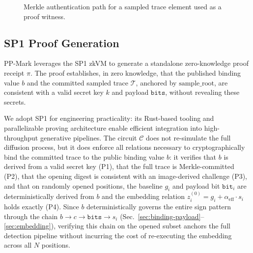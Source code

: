 \documentclass{article}
\theoremstyle{plain}
\theoremstyle{definition}
\theoremstyle{remark}
\begin{document}
\begin{figure}[t]
  \centering
  \caption{Merkle authentication path for a sampled trace element used as a proof witness.}
  \label{fig:merkle}
\end{figure}

\subsection{SP1 Proof Generation}
PP-Mark leverages the SP1 zkVM \cite{succinct2024sp1} to generate a standalone zero-knowledge proof receipt \(\pi\). The proof establishes, in zero knowledge, that the published binding value \(b\) and the committed sampled trace \(\mathcal{T}\), anchored by \(\mathrm{sample\_root}\), are consistent with a valid secret key \(k\) and payload \(\mathtt{bits}\), without revealing these secrets.

We adopt SP1 for engineering practicality: its Rust-based tooling and parallelizable proving architecture enable efficient integration into high-throughput generative pipelines. The circuit \(\mathcal{C}\) does not re-simulate the full diffusion process, but it does enforce all relations necessary to cryptographically bind the committed trace to the public binding value $b$: it verifies that $b$ is derived from a valid secret key (P1), that the full trace is Merkle-committed (P2), that the opening digest is consistent with an image-derived challenge (P3), and that on randomly opened positions, the baseline $g_i$ and payload bit $\mathtt{bit}_i$ are deterministically derived from $b$ and the embedding relation $z_i^{(0)} = g_i + \alpha_{\mathrm{eff}} \cdot s_i$ holds exactly (P4). Since $b$ deterministically governs the entire sign pattern through the chain $b \to c \to \mathtt{bits} \to s_i$ (Sec.~\ref{sec:binding-payload}--\ref{sec:embedding}), verifying this chain on the opened subset anchors the full detection pipeline without incurring the cost of re-executing the embedding across all $N$ positions.
\end{document}
